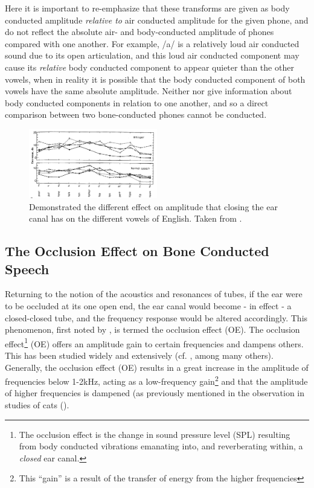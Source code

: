\documentclass[dissertation,copyright]{uathesis}
\begin{document}
Here it is important to re-emphasize that these transforms are given as body conducted amplitude \textit{relative to} air conducted amplitude for the given phone, and do not reflect the absolute air- and body-conducted amplitude of phones compared with one another.  For example, /a/ is a relatively loud air conducted sound due to its open articulation, and this loud air conducted component may cause its \textit{relative} body conducted component to appear quieter than the other vowels, when in reality it is possible that the body conducted component of both vowels have the same absolute amplitude.  Neither \cite{bekesy:60} nor \cite{reinfeldt:10} give information about body conducted components in relation to one another, and so a direct comparison between two bone-conducted phones cannot be conducted.


\begin{figure}
\includegraphics[width=0.5\textwidth]{figure/bekesy60-3.png}
\caption{Demonstrated the different effect on amplitude that closing the ear canal has on the different vowels of English.  Taken from \cite{bekesy:60}.}
\label{bekesyPhoneDiff}
\end{figure}

\subsection{The Occlusion Effect on Bone Conducted Speech}

Returning to the notion of the acoustics and resonances of tubes, if the ear were to be occluded at its one open end, the ear canal would become - in effect - a closed-closed tube, and the frequency response would be altered accordingly.  This phenomenon, first noted by \cite{wheatstone:79}, is termed the occlusion effect (OE).  The occlusion effect\footnote{The occlusion effect is the change in sound pressure level (SPL) resulting from body conducted vibrations emanating into, and reverberating within, a \textit{closed} ear canal.} (OE) offers an amplitude gain to certain frequencies and dampens others.  This has been studied widely and extensively (cf. \cite{wheatstone:79,kelly:37,littler:52,goldstein:65}, among many others).  Generally, the occlusion effect (OE) results in a great increase in the amplitude of frequencies below 1-2kHz, acting as a low-frequency gain\footnote{This ``gain'' is a result of the transfer of energy from the higher frequencies} and that the amplitude of higher frequencies is dampened (as previously mentioned in the observation in studies of cats (\cite{tonndorf:72}).
\end{document}

